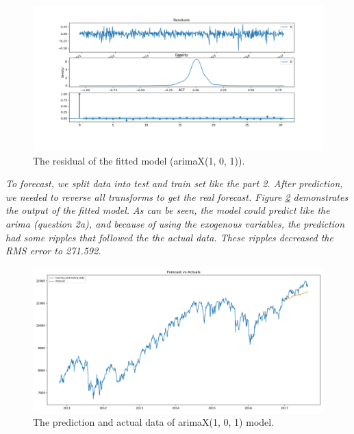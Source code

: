 \begin{figure}[H]
    \centering
    \begin{minipage}[b]{1\textwidth}
        \includegraphics[width=\textwidth]{manuscript/src/figures/Ass2/Ass2_Q3_residual_plot.png}
    \end{minipage}
    \caption{The residual of the fitted model (\gls{arima}X(1, 0, 1)).}
    \label{fig:Ass2_Q3_residual_plot}
\end{figure}

\textit{To forecast, we split data into test and train set like the part 2. After prediction, we needed to reverse all transforms to get the real forecast. Figure \ref{fig:Ass2_Q3_Forecast_vs_Actuals} demonstrates the output of the fitted model. As can be seen, the model could predict like the \gls{arima} (question 2a), and because of using the exogenous variables, the prediction had some ripples that followed the the actual data. These ripples decreased the RMS error to 271.592.} 

\begin{figure}[H]
    \centering
    \begin{minipage}[b]{1\textwidth}
        \includegraphics[width=\textwidth]{manuscript/src/figures/Ass2/Ass2_Q3_Forecast_vs_Actuals.png}
    \end{minipage}
    \caption{The prediction and actual data of \gls{arima}X(1, 0, 1) model.}
    \label{fig:Ass2_Q3_Forecast_vs_Actuals}
\end{figure}





